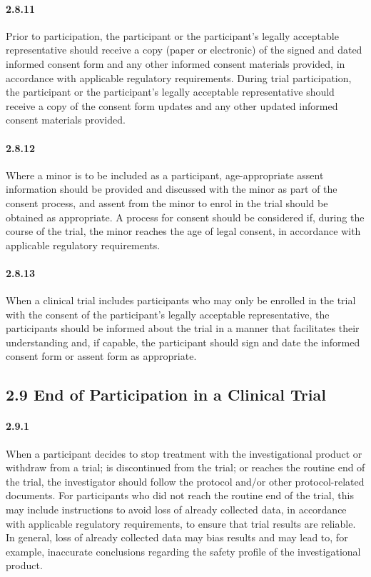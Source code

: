 \documentclass[11pt]{article}
\begin{document}
\paragraph{2.8.11} Prior to participation, the participant or the participant's legally acceptable representative should receive a copy (paper or electronic) of the signed and dated informed consent form and any other informed consent materials provided, in accordance with applicable regulatory requirements. During trial participation, the participant or the participant's legally acceptable representative should receive a copy of the consent form updates and any other updated informed consent materials provided.

\paragraph{2.8.12} Where a minor is to be included as a participant, age-appropriate assent information should be provided and discussed with the minor as part of the consent process, and assent from the minor to enrol in the trial should be obtained as appropriate. A process for consent should be considered if, during the course of the trial, the minor reaches the age of legal consent, in accordance with applicable regulatory requirements.

\paragraph{2.8.13} When a clinical trial includes participants who may only be enrolled in the trial with the consent of the participant's legally acceptable representative, the participants should be informed about the trial in a manner that facilitates their understanding and, if capable, the participant should sign and date the informed consent form or assent form as appropriate.

\subsection{2.9 End of Participation in a Clinical Trial}

\paragraph{2.9.1} When a participant decides to stop treatment with the investigational product or withdraw from a trial; is discontinued from the trial; or reaches the routine end of the trial, the investigator should follow the protocol and/or other protocol-related documents. For participants who did not reach the routine end of the trial, this may include instructions to avoid loss of already collected data, in accordance with applicable regulatory requirements, to ensure that trial results are reliable. In general, loss of already collected data may bias results and may lead to, for example, inaccurate conclusions regarding the safety profile of the investigational product.
\end{document}
